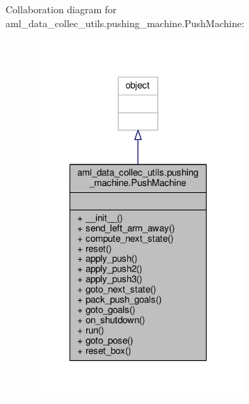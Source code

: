 Collaboration diagram for aml\-\_\-data\-\_\-collec\-\_\-utils.\-pushing\-\_\-machine.\-Push\-Machine\-:\nopagebreak
\begin{figure}[H]
\begin{center}
\leavevmode
\includegraphics[width=226pt]{classaml__data__collec__utils_1_1pushing__machine_1_1_push_machine__coll__graph}
\end{center}
\end{figure}
